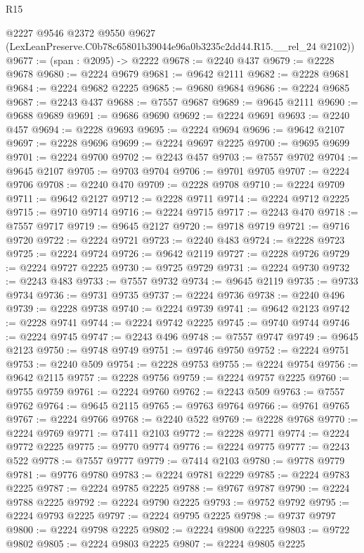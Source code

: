 \begin{lexlean}{R15}
\begin{coremodule}
      @2227
      @9546
      @2372
      @9550
      @9627
      (LexLeanPreserve.C0b78c65801b39044e96a0b3235c2dd44.R15.__rel_24 @2102))
@9677 := (span : @2095) -> @2222
@9678 := @2240 @437
@9679 := @2228 @9678
@9680 := @2224 @9679
@9681 := @9642 @2111
@9682 := @2228 @9681
@9684 := @2224 @9682 @2225
@9685 := @9680 @9684
@9686 := @2224 @9685
@9687 := @2243 @437
@9688 := @7557 @9687
@9689 := @9645 @2111
@9690 := @9688 @9689
@9691 := @9686 @9690
@9692 := @2224 @9691
@9693 := @2240 @457
@9694 := @2228 @9693
@9695 := @2224 @9694
@9696 := @9642 @2107
@9697 := @2228 @9696
@9699 := @2224 @9697 @2225
@9700 := @9695 @9699
@9701 := @2224 @9700
@9702 := @2243 @457
@9703 := @7557 @9702
@9704 := @9645 @2107
@9705 := @9703 @9704
@9706 := @9701 @9705
@9707 := @2224 @9706
@9708 := @2240 @470
@9709 := @2228 @9708
@9710 := @2224 @9709
@9711 := @9642 @2127
@9712 := @2228 @9711
@9714 := @2224 @9712 @2225
@9715 := @9710 @9714
@9716 := @2224 @9715
@9717 := @2243 @470
@9718 := @7557 @9717
@9719 := @9645 @2127
@9720 := @9718 @9719
@9721 := @9716 @9720
@9722 := @2224 @9721
@9723 := @2240 @483
@9724 := @2228 @9723
@9725 := @2224 @9724
@9726 := @9642 @2119
@9727 := @2228 @9726
@9729 := @2224 @9727 @2225
@9730 := @9725 @9729
@9731 := @2224 @9730
@9732 := @2243 @483
@9733 := @7557 @9732
@9734 := @9645 @2119
@9735 := @9733 @9734
@9736 := @9731 @9735
@9737 := @2224 @9736
@9738 := @2240 @496
@9739 := @2228 @9738
@9740 := @2224 @9739
@9741 := @9642 @2123
@9742 := @2228 @9741
@9744 := @2224 @9742 @2225
@9745 := @9740 @9744
@9746 := @2224 @9745
@9747 := @2243 @496
@9748 := @7557 @9747
@9749 := @9645 @2123
@9750 := @9748 @9749
@9751 := @9746 @9750
@9752 := @2224 @9751
@9753 := @2240 @509
@9754 := @2228 @9753
@9755 := @2224 @9754
@9756 := @9642 @2115
@9757 := @2228 @9756
@9759 := @2224 @9757 @2225
@9760 := @9755 @9759
@9761 := @2224 @9760
@9762 := @2243 @509
@9763 := @7557 @9762
@9764 := @9645 @2115
@9765 := @9763 @9764
@9766 := @9761 @9765
@9767 := @2224 @9766
@9768 := @2240 @522
@9769 := @2228 @9768
@9770 := @2224 @9769
@9771 := @7411 @2103
@9772 := @2228 @9771
@9774 := @2224 @9772 @2225
@9775 := @9770 @9774
@9776 := @2224 @9775
@9777 := @2243 @522
@9778 := @7557 @9777
@9779 := @7414 @2103
@9780 := @9778 @9779
@9781 := @9776 @9780
@9783 := @2224 @9781 @2229
@9785 := @2224 @9783 @2225
@9787 := @2224 @9785 @2225
@9788 := @9767 @9787
@9790 := @2224 @9788 @2225
@9792 := @2224 @9790 @2225
@9793 := @9752 @9792
@9795 := @2224 @9793 @2225
@9797 := @2224 @9795 @2225
@9798 := @9737 @9797
@9800 := @2224 @9798 @2225
@9802 := @2224 @9800 @2225
@9803 := @9722 @9802
@9805 := @2224 @9803 @2225
@9807 := @2224 @9805 @2225

\end{coremodule}
\end{lexlean}

